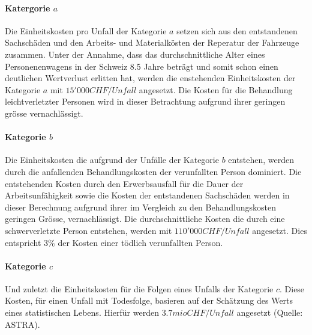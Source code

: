 \paragraph{Katergorie $a$} Die Einheitskosten pro Unfall der Kategorie $a$ setzen sich aus den entstandenen Sachschäden und den Arbeits- und Materialkösten der Reperatur der Fahrzeuge zusammen. Unter der Annahme, dass das durchschnittliche Alter eines Personenenwagens in der Schweiz 8.5 Jahre beträgt und somit schon einen deutlichen Wertverlust erlitten hat, werden die enstehenden Einheitskosten der Kategorie $a$ mit $15'000 CHF/Unfall$ angesetzt. Die Kosten für die Behandlung leichtverletzter Personen wird in dieser Betrachtung aufgrund ihrer geringen grösse vernachlässigt.

\paragraph{Kategorie $b$} Die Einheitskosten die aufgrund der Unfälle der Kategorie $b$ entstehen, werden durch die anfallenden Behandlungskosten der verunfallten Person dominiert. Die entstehenden Kosten durch den Erwerbsausfall für die Dauer der Arbeitsunfähigkeit sowie die Kosten der entstandenen Sachschäden werden in dieser Berechnung aufgrund ihrer im Vergleich zu den Behandlungskosten geringen Grösse, vernachlässigt. Die durchschnittliche Kosten die durch eine schwerverletzte Person entstehen, werden mit $110'000 CHF/Unfall$ angesetzt. Dies entspricht 3\% der Kosten einer tödlich verunfallten Person.

\paragraph{Kategorie $c$} Und zuletzt die Einheitskosten für die Folgen eines Unfalls der Kategorie $c$. Diese Kosten, für einen Unfall mit Todesfolge, basieren auf der Schätzung des Werts eines statistischen Lebens. Hierfür werden $3.7mio CHF/Unfall$ angesetzt (Quelle: ASTRA).






%


